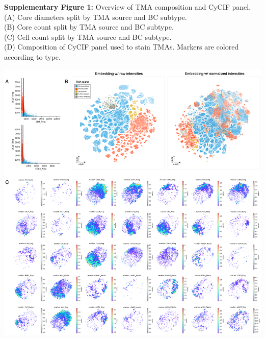 \documentclass[preprint,review,3p,12pt]{elsarticle}
\begin{document}
\newpage

\noindent
\textbf{Supplementary Figure 1:} Overview of TMA composition and CyCIF panel. \\
(A) Core diameters split by TMA source and BC subtype.\\
(B) Core count split by TMA source and BC subtype.\\
(C) Cell count split by TMA source and BC subtype.\\
(D) Composition of CyCIF panel used to stain TMAs. Markers are colored according to type.

\begin{suppfigure}[p]
\centering\includegraphics[width=\linewidth,
                 keepaspectratio]{suppfig2}
\caption{}
\label{fig:suppfig2}
\end{suppfigure}

\newpage
\end{document}
